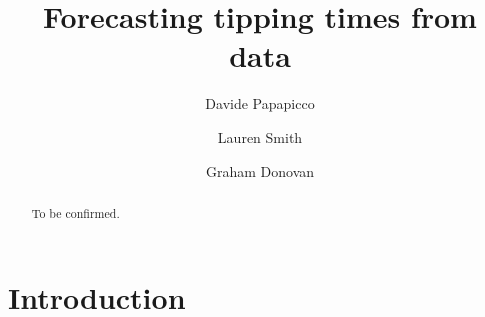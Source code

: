 \documentclass[11pt,a4paper]{article}
\title{Forecasting tipping times from data}
\author[1]{Davide Papapicco}
\author[1]{Lauren Smith}
\author[1]{Graham Donovan}
\affil[1]{Department of Mathematics, University of Auckland, New Zealand}
\date{}
\begin{document}
\maketitle

\begin{abstract}\noindent
        To be confirmed.
\end{abstract}

\section{Introduction}\label{sec:intro}

\printbibliography
\end{document}
